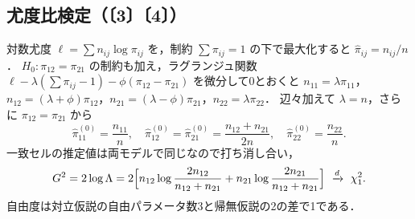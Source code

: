 \subsection{尤度比検定（〔3〕〔4〕）}\label{subsec:04-mclrt}
対数尤度 $\ell=\sum n_{ij}\log\pi_{ij}$ を，制約 $\sum\pi_{ij}=1$ の下で最大化すると $\hat\pi_{ij}=n_{ij}/n$．
$H_0:\pi_{12}=\pi_{21}$ の制約も加え，ラグランジュ関数
$\ell-\lambda(\sum\pi_{ij}-1)-\phi(\pi_{12}-\pi_{21})$ を微分して0とおくと
$n_{11}=\lambda\pi_{11}$，$n_{12}=(\lambda+\phi)\pi_{12}$，$n_{21}=(\lambda-\phi)\pi_{21}$，$n_{22}=\lambda\pi_{22}$．
辺々加えて $\lambda=n$，さらに $\pi_{12}=\pi_{21}$ から
\[
\hat\pi_{11}^{(0)}=\frac{n_{11}}{n},\quad \hat\pi_{12}^{(0)}=\hat\pi_{21}^{(0)}=\frac{n_{12}+n_{21}}{2n},\quad \hat\pi_{22}^{(0)}=\frac{n_{22}}{n}.
\]
一致セルの推定値は両モデルで同じなので打ち消し合い，
\begin{equation}
G^2=2\log\Lambda=2\Bigl[n_{12}\log\frac{2n_{12}}{n_{12}+n_{21}}+n_{21}\log\frac{2n_{21}}{n_{12}+n_{21}}\Bigr]\ \xrightarrow{d}\ \chi^2_1.\label{eq:04-mclrt}
\end{equation}
自由度は対立仮説の自由パラメータ数3と帰無仮説の2の差で1である．

